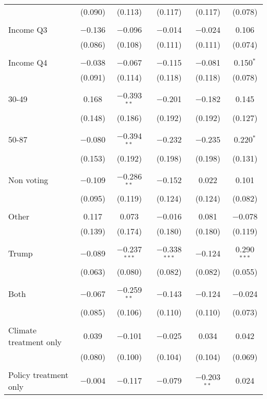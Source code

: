 \begin{tabular}{@{\extracolsep{5pt}}lccccc}
  & (0.090) & (0.113) & (0.117) & (0.117) & (0.078) \\ 
  & & & & & \\ 
 Income Q3 & $-$0.136 & $-$0.096 & $-$0.014 & $-$0.024 & 0.106 \\ 
  & (0.086) & (0.108) & (0.111) & (0.111) & (0.074) \\ 
  & & & & & \\ 
 Income Q4 & $-$0.038 & $-$0.067 & $-$0.115 & $-$0.081 & 0.150$^{*}$ \\ 
  & (0.091) & (0.114) & (0.118) & (0.118) & (0.078) \\ 
  & & & & & \\ 
 30-49 & 0.168 & $-$0.393$^{**}$ & $-$0.201 & $-$0.182 & 0.145 \\ 
  & (0.148) & (0.186) & (0.192) & (0.192) & (0.127) \\ 
  & & & & & \\ 
 50-87 & $-$0.080 & $-$0.394$^{**}$ & $-$0.232 & $-$0.235 & 0.220$^{*}$ \\ 
  & (0.153) & (0.192) & (0.198) & (0.198) & (0.131) \\ 
  & & & & & \\ 
 Non voting & $-$0.109 & $-$0.286$^{**}$ & $-$0.152 & 0.022 & 0.101 \\ 
  & (0.095) & (0.119) & (0.124) & (0.124) & (0.082) \\ 
  & & & & & \\ 
 Other & 0.117 & 0.073 & $-$0.016 & 0.081 & $-$0.078 \\ 
  & (0.139) & (0.174) & (0.180) & (0.180) & (0.119) \\ 
  & & & & & \\ 
 Trump & $-$0.089 & $-$0.237$^{***}$ & $-$0.338$^{***}$ & $-$0.124 & 0.290$^{***}$ \\ 
  & (0.063) & (0.080) & (0.082) & (0.082) & (0.055) \\ 
  & & & & & \\ 
 Both & $-$0.067 & $-$0.259$^{**}$ & $-$0.143 & $-$0.124 & $-$0.024 \\ 
  & (0.085) & (0.106) & (0.110) & (0.110) & (0.073) \\ 
  & & & & & \\ 
 Climate treatment only & 0.039 & $-$0.101 & $-$0.025 & 0.034 & 0.042 \\ 
  & (0.080) & (0.100) & (0.104) & (0.104) & (0.069) \\ 
  & & & & & \\ 
 Policy treatment only & $-$0.004 & $-$0.117 & $-$0.079 & $-$0.203$^{**}$ & 0.024 \\ 

\end{tabular}
